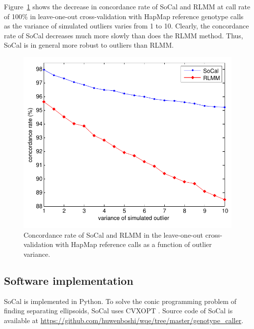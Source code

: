 \documentclass{scrartcl}
\begin{document}
\par
Figure~\ref{fig:result_cmp_noise} shows the decrease in concordance rate of
SoCal and RLMM at call rate of 100\% in leave-one-out cross-validation with
HapMap reference genotype calls as the variance of simulated outliers varies
from 1 to 10.
Clearly, the concordance rate of SoCal decreases much more slowly than does
the RLMM method.
Thus, SoCal is in general more robust to outliers than RLMM.

\begin{figure}[H]
\centering
\includegraphics[scale=0.75]
{result_figs/cmp_socal_gauss_noise/socal_gauss_cmp_noise.pdf}
\caption{Concordance rate of SoCal and RLMM in the leave-one-out
cross-validation with HapMap reference calls as a function of outlier
variance.}
\label{fig:result_cmp_noise}
\end{figure}

\subsection{Software implementation}
SoCal is implemented in Python.
To solve the conic programming problem of finding separating ellipsoids,
SoCal uses CVXOPT \cite{andersen2014}.
Source code of SoCal is available at
\url{https://github.com/huwenboshi/wqe/tree/master/genotype_caller}.
\end{document}
